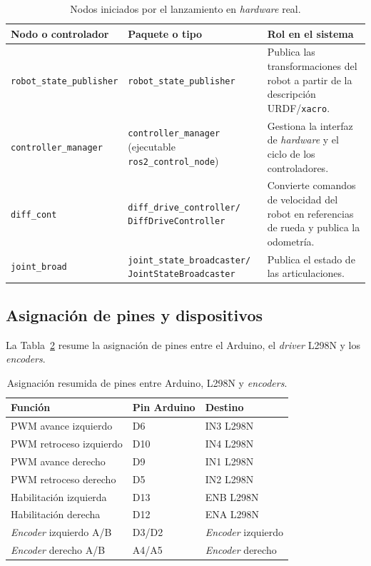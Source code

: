 \begin{appendices}
\begin{table}[H]
\centering
\caption{Nodos iniciados por el lanzamiento en \textit{hardware} real.}
\label{tab:anx_nodos_lanzamiento}
\small
\begin{tabular}{p{4.0cm} p{4.4cm} p{4.9cm}}
\toprule
\textbf{Nodo o controlador} & \textbf{Paquete o tipo} & \textbf{Rol en el sistema} \\
\midrule
\texttt{robot\_state\_publisher} &
\texttt{robot\_state\_publisher} &
Publica las transformaciones del robot a partir de la descripción URDF/\texttt{xacro}. \\

\texttt{controller\_manager} &
\texttt{controller\_manager} (ejecutable \texttt{ros2\_control\_node}) &
Gestiona la interfaz de \textit{hardware} y el ciclo de los controladores. \\

\texttt{diff\_cont} &
\texttt{diff\_drive\_controller/} \texttt{DiffDriveController} &
Convierte comandos de velocidad del robot en referencias de rueda y publica la odometría. \\

\texttt{joint\_broad} &
\texttt{joint\_state\_broadcaster/} \texttt{JointStateBroadcaster} &
Publica el estado de las articulaciones. \\
\bottomrule
\end{tabular}
\end{table}

\subsection{Asignación de pines y dispositivos}
\label{anx:pinout_dispositivos}
La Tabla~\ref{tab:anx_pinout_arduino_l298n} resume la asignación de pines
entre el \gls{Arduino}, el \textit{driver} L298N y los \textit{encoders}.

\begin{table}[H]
\centering
\caption{Asignación resumida de pines entre \gls{Arduino}, L298N y \textit{encoders}.}
\label{tab:anx_pinout_arduino_l298n}
\small
\begin{tabular}{lll}
\toprule
\textbf{Función} & \textbf{Pin Arduino} & \textbf{Destino} \\
\midrule
PWM avance izquierdo & D6 & IN3 L298N \\
PWM retroceso izquierdo & D10 & IN4 L298N \\
PWM avance derecho & D9 & IN1 L298N \\
PWM retroceso derecho & D5 & IN2 L298N \\
Habilitación izquierda & D13 & ENB L298N \\
Habilitación derecha & D12 & ENA L298N \\
\textit{Encoder} izquierdo A/B & D3/D2 & \textit{Encoder} izquierdo \\
\textit{Encoder} derecho A/B & A4/A5 & \textit{Encoder} derecho \\
\bottomrule
\end{tabular}
\end{table}


\end{appendices}
